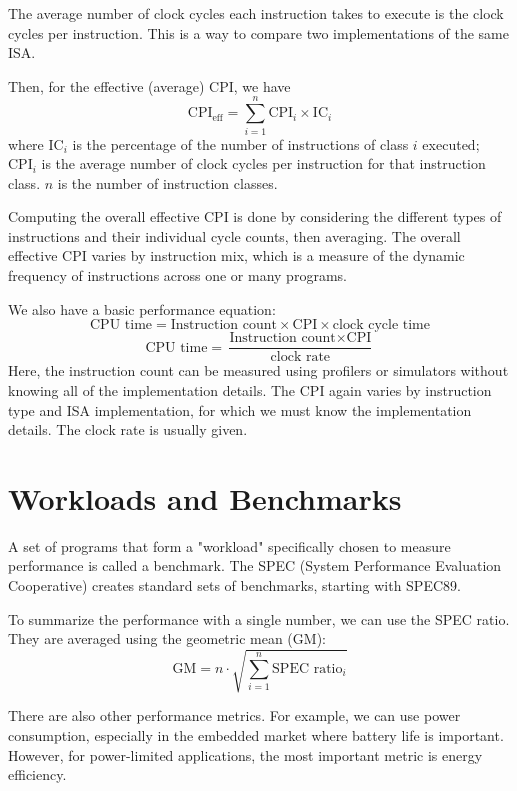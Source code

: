 The average number of clock cycles each instruction takes to execute is the clock cycles per instruction. This is a way to compare two implementations of the same ISA.

Then, for the effective (average) CPI, we have
\[
  \text{CPI}_{\text{eff}} = \sum_{i = 1}^n \text{CPI}_i \times \text{IC}_i
\]
where \(\text{IC}_i\) is the percentage of the number of instructions of class \(i\) executed; \(\text{CPI}_i\) is the average number of clock cycles per instruction for that instruction class. \(n\) is the number of instruction classes.

Computing the overall effective CPI is done by considering the different types of instructions and their individual cycle counts, then averaging. The overall effective CPI varies by instruction mix, which is a measure of the dynamic frequency of instructions across one or many programs.

We also have a basic performance equation:
\[
  \text{CPU time} = \text{Instruction count} \times \text{CPI} \times \text{clock cycle time}
\]
\[
  \text{CPU time} = \dfrac{\text{Instruction count} \times \text{CPI}}{\text{clock rate}}
\]
Here, the instruction count can be measured using profilers or simulators without knowing all of the implementation details. The CPI again varies by instruction type and ISA implementation, for which we must know the implementation details. The clock rate is usually given.

\section{Workloads and Benchmarks}
A set of programs that form a "workload" specifically chosen to measure performance is called a benchmark. The SPEC (System Performance Evaluation Cooperative) creates standard sets of benchmarks, starting with SPEC89.

To summarize the performance with a single number, we can use the SPEC ratio. They are averaged using the geometric mean (GM): 
\[
  \text{GM} = n \cdot \sqrt{\sum_{i = 1}^n \text{SPEC ratio}_i} 
\]

There are also other performance metrics. For example, we can use power consumption, especially in the embedded market where battery life is important. However, for power-limited applications, the most important metric is energy efficiency.
